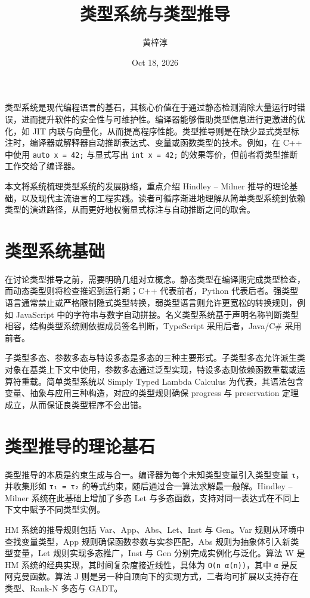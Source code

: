 \title{类型系统与类型推导}
\author{黄梓淳}
\date{Oct 18, 2026}
\maketitle
类型系统是现代编程语言的基石，其核心价值在于通过静态检测消除大量运行时错误，进而提升软件的安全性与可维护性。编译器能够借助类型信息进行更激进的优化，如 JIT 内联与向量化，从而提高程序性能。类型推导则是在缺少显式类型标注时，编译器或解释器自动推断表达式、变量或函数类型的技术。例如，在 C++ 中使用 \texttt{auto x = 42;} 与显式写出 \texttt{int x = 42;} 的效果等价，但前者将类型推断工作交给了编译器。\par
本文将系统梳理类型系统的发展脉络，重点介绍 Hindley – Milner 推导的理论基础，以及现代主流语言的工程实践。读者可循序渐进地理解从简单类型系统到依赖类型的演进路径，从而更好地权衡显式标注与自动推断之间的取舍。\par
\chapter{类型系统基础}
在讨论类型推导之前，需要明确几组对立概念。静态类型在编译期完成类型检查，而动态类型则将检查推迟到运行期；C++ 代表前者，Python 代表后者。强类型语言通常禁止或严格限制隐式类型转换，弱类型语言则允许更宽松的转换规则，例如 JavaScript 中的字符串与数字自动拼接。名义类型系统基于声明名称判断类型相容，结构类型系统则依据成员签名判断，TypeScript 采用后者，Java/C\#{} 采用前者。\par
子类型多态、参数多态与特设多态是多态的三种主要形式。子类型多态允许派生类对象在基类上下文中使用，参数多态通过泛型实现，特设多态则依赖函数重载或运算符重载。简单类型系统以 Simply Typed Lambda Calculus 为代表，其语法包含变量、抽象与应用三种构造，对应的类型规则确保 progress 与 preservation 定理成立，从而保证良类型程序不会出错。\par
\chapter{类型推导的理论基石}
类型推导的本质是约束生成与合一。编译器为每个未知类型变量引入类型变量 \texttt{τ}，并收集形如 \texttt{τ₁ = τ₂} 的等式约束，随后通过合一算法求解最一般解。Hindley – Milner 系统在此基础上增加了多态 Let 与多态函数，支持对同一表达式在不同上下文中赋予不同类型实例。\par
HM 系统的推导规则包括 Var、App、Abs、Let、Inst 与 Gen。Var 规则从环境中查找变量类型，App 规则确保函数参数与实参匹配，Abs 规则为抽象体引入新类型变量，Let 规则实现多态推广，Inst 与 Gen 分别完成实例化与泛化。算法 W 是 HM 系统的经典实现，其时间复杂度接近线性，具体为 \texttt{O(n α(n))}，其中 \texttt{α} 是反阿克曼函数。算法 J 则是另一种自顶向下的实现方式，二者均可扩展以支持存在类型、Rank-N 多态与 GADT。\par
